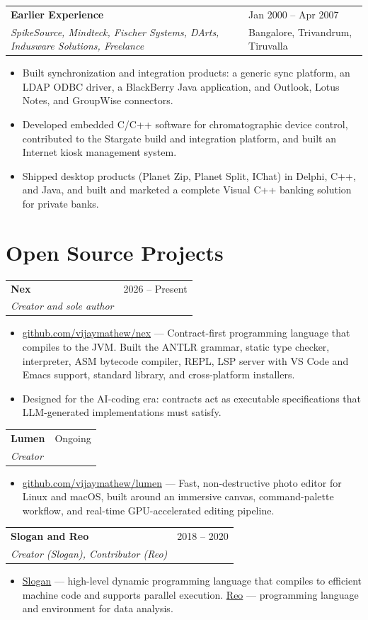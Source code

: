 \documentclass[10pt,letterpaper]{article}
\makeatletter
\newcommand{\entry}[4]{
  \vspace{0.25em}
  \begin{tabularx}{\textwidth}{@{}X>{\raggedleft\arraybackslash}p{2.35in}@{}}
    {\bfseries #1} & {\small\color{muted} #2} \\
    {\itshape #3} & {\small\color{muted} #4} \\
  \end{tabularx}\vspace{0.1em}
}
\makeatother
\begin{document}
\entry{Earlier Experience}{Jan 2000 -- Apr 2007}{SpikeSource, Mindteck, Fischer Systems, DArts, Indusware Solutions, Freelance}{Bangalore, Trivandrum, Tiruvalla}
\begin{itemize}
  \item Built synchronization and integration products: a generic sync platform, an LDAP ODBC driver, a BlackBerry Java application, and Outlook, Lotus Notes, and GroupWise connectors.
  \item Developed embedded C/C++ software for chromatographic device control, contributed to the Stargate build and integration platform, and built an Internet kiosk management system.
  \item Shipped desktop products (Planet Zip, Planet Split, IChat) in Delphi, C++, and Java, and built and marketed a complete Visual C++ banking solution for private banks.
\end{itemize}

\section*{Open Source Projects}
\entry{Nex}{2026 -- Present}{Creator and sole author}{}
\begin{itemize}
  \item \href{https://github.com/vijaymathew/nex}{github.com/vijaymathew/nex} --- Contract-first programming language that compiles to the JVM. Built the ANTLR grammar, static type checker, interpreter, ASM bytecode compiler, REPL, LSP server with VS Code and Emacs support, standard library, and cross-platform installers.
  \item Designed for the AI-coding era: contracts act as executable specifications that LLM-generated implementations must satisfy.
\end{itemize}

\entry{Lumen}{Ongoing}{Creator}{}
\begin{itemize}
  \item \href{https://github.com/vijaymathew/lumen}{github.com/vijaymathew/lumen} --- Fast, non-destructive photo editor for Linux and macOS, built around an immersive canvas, command-palette workflow, and real-time GPU-accelerated editing pipeline.
\end{itemize}

\entry{Slogan and Reo}{2018 -- 2020}{Creator (Slogan), Contributor (Reo)}{}
\begin{itemize}
  \item \href{http://schemer.in/slogan}{Slogan} --- high-level dynamic programming language that compiles to efficient machine code and supports parallel execution. \href{https://github.com/anvetsu/reo}{Reo} --- programming language and environment for data analysis.
\end{itemize}
\end{document}
